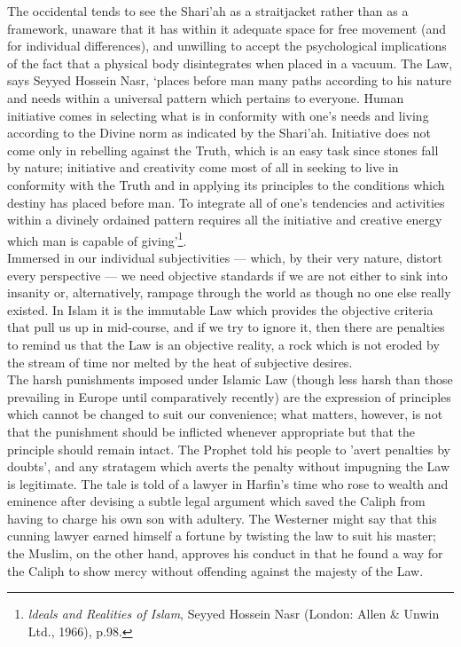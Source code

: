 \documentclass[10pt, twoside,openright]{book}
\begin{document}
The occidental tends to see the Shari'ah as a straitjacket rather than as a framework, unaware that 
it has within it adequate space for free movement (and for individual differences), and unwilling to 
accept the psychological implications of the fact that a physical body disintegrates when placed in a 
vacuum. The Law, says Seyyed Hossein Nasr, `places before man many paths according to his nature and 
needs within a universal pattern which pertains to everyone. Human initiative comes in selecting what 
is in conformity with one's needs and living according to the Divine norm as indicated by the 
Shari'ah. Initiative does not come only in rebelling against the Truth, which is an easy task since 
stones fall by nature; initiative and creativity come most of all in seeking to live in conformity 
with the Truth and in applying its principles to the conditions which destiny has placed before man. 
To integrate all of one's tendencies and activities within a divinely ordained pattern requires all 
the initiative and creative energy which man is capable of giving'\footnote{\emph{ldeals and Realities of Islam}, Seyyed Hossein Nasr (London: Allen \& Unwin Ltd., 1966), p.98.}. \\

Immersed in our individual subjectivities --- which, by their very nature, distort every perspective --- 
we need objective standards if we are not either to sink into insanity or, alternatively, rampage 
through the world as though no one else really existed. In Islam it is the immutable Law which 
provides the objective criteria that pull us up in mid\hyp{}course, and if we try to ignore it, then there 
are penalties to remind us that the Law is an objective reality, a rock which is not eroded by the 
stream of time nor melted by the heat of subjective desires. \\

The harsh punishments imposed under Islamic Law (though less harsh than those prevailing in Europe 
until comparatively recently) are the expression of principles which cannot be changed to suit our 
convenience; what matters, however, is not that the punishment should be inflicted whenever 
appropriate but that the principle should remain intact. The Prophet told his people to 'avert 
penalties by doubts', and any stratagem which averts the penalty without impugning the Law is 
legitimate. The tale is told of a lawyer in Harfin's time who rose to wealth and eminence after 
devising a subtle legal argument which saved the Caliph from having to charge his own son with 
adultery. The Westerner might say that this cunning lawyer earned himself a fortune by twisting the 
law to suit his master; the Muslim, on the other hand, approves his conduct in that he found a way 
for the Caliph to show mercy without offending against the majesty of the Law. \\
\end{document}
